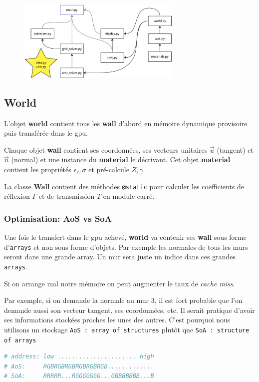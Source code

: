 \documentclass[sn-mathphys-num]{sn-jnl}
\begin{document}
\begin{figure}[H]
    \centering
    \includegraphics[width=0.7\textwidth]{images/programme.jpeg}
\end{figure}

\subsection{World}

L'objet \textbf{world} contient tous les \textbf{wall} d'abord en mémoire dynamique provisoire
puis transférée dans le gpu.

Chaque objet \textbf{wall} contient ses coordonnées, ses vecteurs unitaires $\vec{u}$ (tangent)
et $\vec{n}$ (normal) et une instance du \textbf{material} le décrivant.
Cet objet \textbf{material} contient les propriétés $\epsilon_r, \sigma$ et pré-calcule $Z, \gamma$.

La classe \textbf{Wall} contient des méthodes \texttt{@static} pour calculer les coefficients
de réflexion $\Gamma$ et de transmission $T$ en module carré.

\subsubsection{Optimisation: AoS vs SoA}
Une fois le transfert dans le gpu achevé, 
\textbf{world} va contenir ses \textbf{wall} sous forme 
d'\texttt{arrays} et non sous forme d'objets.
Par exemple les normales de tous les murs seront dans une grande array.
Un mur sera juste un indice dans ces grandes \texttt{arrays}.

Si on arrange mal notre mémoire on peut augmenter le taux de \textit{cache miss}.

Par exemple, si on demande la normale au mur 3, il est fort probable
que l'on demande aussi son vecteur tangent, ses coordonnées, etc. 
Il serait pratique d'avoir ses informations stockées proches 
les unes des autres.
C'est pourquoi nous utilisons un stockage \texttt{AoS : array of structures}
plutôt que \texttt{SoA : structure of arrays}
\begin{lstlisting}[language=python]
# address: low ...................... high
# AoS:     RGBRGBRGBRGBRGBRGB.............
# SoA:     RRRRR...RGGGGGGG...GBBBBBBB...B    
\end{lstlisting}
\end{document}
